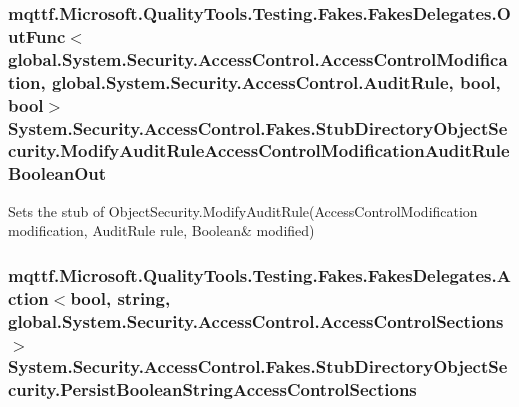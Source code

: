\hypertarget{class_system_1_1_security_1_1_access_control_1_1_fakes_1_1_stub_directory_object_security_a5fda25b93691fc596cfe00522d30bb87}{
\subsubsection[{Modify\-Audit\-Rule\-Access\-Control\-Modification\-Audit\-Rule\-Boolean\-Out}]{\setlength{\rightskip}{0pt plus 5cm}mqttf.\-Microsoft.\-Quality\-Tools.\-Testing.\-Fakes.\-Fakes\-Delegates.\-Out\-Func$<$global.\-System.\-Security.\-Access\-Control.\-Access\-Control\-Modification, global.\-System.\-Security.\-Access\-Control.\-Audit\-Rule, bool, bool$>$ System.\-Security.\-Access\-Control.\-Fakes.\-Stub\-Directory\-Object\-Security.\-Modify\-Audit\-Rule\-Access\-Control\-Modification\-Audit\-Rule\-Boolean\-Out}}\label{class_system_1_1_security_1_1_access_control_1_1_fakes_1_1_stub_directory_object_security_a5fda25b93691fc596cfe00522d30bb87}


Sets the stub of Object\-Security.\-Modify\-Audit\-Rule(Access\-Control\-Modification modification, Audit\-Rule rule, Boolean\& modified)

\hypertarget{class_system_1_1_security_1_1_access_control_1_1_fakes_1_1_stub_directory_object_security_ac8ace581c4b867d59dac8642b5405698}{
\subsubsection[{Persist\-Boolean\-String\-Access\-Control\-Sections}]{\setlength{\rightskip}{0pt plus 5cm}mqttf.\-Microsoft.\-Quality\-Tools.\-Testing.\-Fakes.\-Fakes\-Delegates.\-Action$<$bool, string, global.\-System.\-Security.\-Access\-Control.\-Access\-Control\-Sections$>$ System.\-Security.\-Access\-Control.\-Fakes.\-Stub\-Directory\-Object\-Security.\-Persist\-Boolean\-String\-Access\-Control\-Sections}}\label{class_system_1_1_security_1_1_access_control_1_1_fakes_1_1_stub_directory_object_security_ac8ace581c4b867d59dac8642b5405698}


